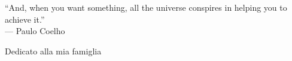 
\cleardoublepage
{}
\thispagestyle{empty}

\vspace*{3cm}

\begin{center}
    “And, when you want something, all the universe conspires in helping you to achieve it.” \\ \medskip
--- Paulo Coelho    
\end{center}

\medskip

\begin{center}
Dedicato alla mia famiglia
\end{center}
